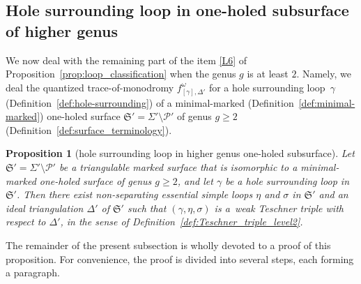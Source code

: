 \documentclass[10pt,a4paper]{amsart}
\numberwithin{equation}{section}
\newtheorem{Proposition}[Theorem]{Proposition}
\theoremstyle{definition}
\begin{document}
\subsection{Hole surrounding loop in one-holed subsurface of higher genus}
\label{subsec:hole-surrounding_loop_in_one-holed_subsurface}
We now deal with the remaining part of the item \ref{L6} of Proposition~\ref{prop:loop_classification} when the genus $g$ is at least $2$. Namely, we deal the quantized trace-of-monodromy $f^\omega_{[\gamma],\Delta'}$ for a hole surrounding loop~$\gamma$ (Definition~\ref{def:hole-surrounding}) of a minimal-marked (Definition~\ref{def:minimal-marked}) one-holed surface $\mathfrak{S}' = \Sigma'\setminus\mathcal{P}'$ of genus $g\ge 2$ (Definition~\ref{def:surface_terminology}).
\begin{Proposition}[hole surrounding loop in higher genus one-holed subsurface]
\label{prop:hole-surrounding_loop_in_higher_genus_one-holed_subsurface}
Let $\mathfrak{S}'=\Sigma'\setminus\mathcal{P}'$ be a triangulable marked surface that is
isomorphic to a minimal-marked one-holed surface of genus $g\ge 2$, and let $\gamma$ be a hole surrounding loop in $\mathfrak{S}'$. Then there exist non-separating essential simple loops $\eta$ and $\sigma$ in $\mathfrak{S}'$ and an ideal triangulation $\Delta'$ of $\mathfrak{S}'$ such that $(\gamma,\eta,\sigma)$ is a~weak Teschner triple with respect to $\Delta'$, in the sense of Definition~{\rm \ref{def:Teschner_triple_level2}}.
\end{Proposition}
The remainder of the present subsection is wholly devoted to a proof of this proposition. For convenience, the proof is divided into several steps, each forming a paragraph.
\end{document}
